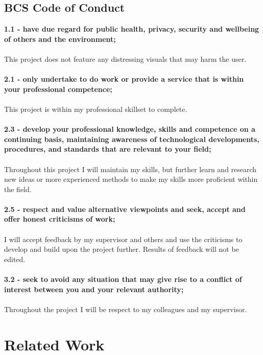 \documentclass[a4paper, 12pt]{article}
\begin{document}
        \subsection{BCS Code of Conduct}
            \textbf{1.1 - have due regard for public health, privacy, security and wellbeing of others 
            and the environment;} \\\\
            This project does not feature any distressing visuals that may harm the user. \\\\
            \textbf{2.1 - only undertake to do work or provide a service that is within your professional 
            competence;} \\\\
            This project is within my professional skillset to complete. \\\\
            \textbf{2.3 - develop your professional knowledge, skills and competence on a continuing 
            basis, maintaining awareness of technological developments, procedures, and standards 
            that are relevant to your field;} \\\\
            Throughout this project I will maintain my skills, but further learn and research new ideas 
            or more experienced methods to make my skills more proficient within the field. \\\\
            \textbf{2.5 - respect and value alternative viewpoints and seek, accept and offer honest 
            criticisms of work;} \\\\
            I will accept feedback by my supervisor and others and use the criticisms to develop and 
            build upon the project further. Results of feedback will not be edited. \\\\
            \textbf{3.2 - seek to avoid any situation that may give rise to a conflict of interest 
            between you and your relevant authority;} \\\\
            Throughout the project I will be respect to my colleagues and my supervisor.

    \clearpage
    \section{Related Work}
\end{document}
